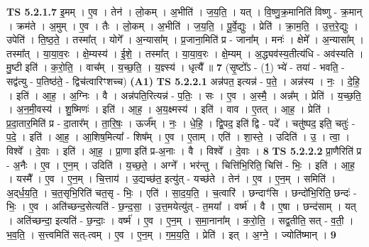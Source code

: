 \documentclass[17pt]{extarticle}
\begin{document}
                                \textbf{ TS 5.2.1.7} \newline
                  इ॒मम् । ए॒व । तेन॑ । लो॒कम् । अ॒भीति॑ । ज॒य॒ति॒ । यत् । वि॒ष्णु॒क्र॒मानिति॑ विष्णु - क्र॒मान् । क्रम॑ते । अ॒मुम् । ए॒व । तैः । लो॒कम् । अ॒भीति॑ । ज॒य॒ति॒ । पू॒र्वे॒द्युः । प्रेति॑ । क्रा॒म॒ति॒ । उ॒त्त॒रे॒द्युः । उपेति॑ । ति॒ष्ठ॒ते॒ । तस्मा᳚त् । योगे᳚ । अ॒न्यासा᳚म् । प्र॒जाना॒मिति॑ प्र - जाना᳚म् । मनः॑ । क्षेमे᳚ । अ॒न्यासा᳚म् । तस्मा᳚त् । या॒या॒व॒रः । क्षे॒म्यस्य॑ । ई॒शे॒ । तस्मा᳚त् । या॒या॒व॒रः । क्षे॒म्यम् । अ॒द्ध्यव॑स्य॒तीत्य॑धि - अव॑स्यति । मु॒ष्टी इति॑ । क॒रो॒ति॒ । वाच᳚म् । य॒च्छ॒ति॒ । य॒ज्ञ्स्य॑ । धृत्यै᳚ ॥ \textbf{  7 } \newline
                  \newline
                      (सृ॒ष्टो᳚ऽ - (1॒) भ्ये॑ - तया॑ - भवति॒ - सद्व॑त्यु - प॒तिष्ठ॑ते॒ - द्विच॑त्वारिꣳशच्च)  \textbf{(A1)} \newline \newline
                                \textbf{ TS 5.2.2.1} \newline
                  अन्न॑पत॒ इत्यन्न॑ - प॒ते॒ । अन्न॑स्य । नः॒ । दे॒हि॒ । इति॑ । आ॒ह॒ । अ॒ग्निः । वै । अन्न॑पति॒रित्यन्न॑ - प॒तिः॒ । सः । ए॒व । अ॒स्मै॒ । अन्न᳚म् । प्रेति॑ । य॒च्छ॒ति॒ । अ॒न॒मी॒वस्य॑ । शु॒ष्मिणः॑ । इति॑ । आ॒ह॒ । अ॒य॒क्ष्मस्य॑ । इति॑ । वाव । ए॒तत् । आ॒ह॒ । प्रेति॑ । प्र॒दा॒तार॒मिति॑ प्र - दा॒तार᳚म् । ता॒रि॒षः॒ । ऊर्ज᳚म् । नः॒ । धे॒हि॒ । द्वि॒पद॒ इति॑ द्वि - पदे᳚ । चतु॑ष्पद॒ इति॒ चतुः॑ - प॒दे॒ । इति॑ । आ॒ह॒ । आ॒शिष॒मित्या᳚ - शिष᳚म् । ए॒व । ए॒ताम् । एति॑ । शा॒स्ते॒ । उदिति॑ । उ॒ । त्वा॒ । विश्वे᳚ । दे॒वाः । इति॑ । आ॒ह॒ । प्रा॒णा इति॑ प्र-अ॒नाः । वै । विश्वे᳚ । दे॒वाः । \textbf{  8} \newline
                  \newline
                                \textbf{ TS 5.2.2.2} \newline
                  प्रा॒णैरिति॑ प्र - अ॒नैः । ए॒व । ए॒न॒म् । उदिति॑ । य॒च्छ॒ते॒ । अग्ने᳚ । भर॑न्तु । चित्ति॑भि॒रिति॒ चित्ति॑ - भिः॒ । इति॑ । आ॒ह॒ । यस्मै᳚ । ए॒व । ए॒न॒म् । चि॒त्ताय॑ । उ॒द्यच्छ॑त॒ इत्यु॑त् - यच्छ॑ते । तेन॑ । ए॒व । ए॒न॒म् । समिति॑ । अ॒द्‌र्ध॒य॒ति॒ । च॒त॒सृभि॒रिति॑ चत॒सृ - भिः॒ । एति॑ । सा॒द॒य॒ति॒ । च॒त्वारि॑ । छन्दाꣳ॑सि । छन्दो॑भि॒रिति॒ छन्दः॑ - भिः॒ । ए॒व । अति॑च्छन्द॒सेत्यति॑ - छ॒न्द॒सा॒ । उ॒त्त॒मयेत्यु॑त् - त॒मया᳚ । वर्ष्म॑ । वै । ए॒षा । छन्द॑साम् । यत् । अति॑च्छन्दा॒ इत्यति॑ - छ॒न्दाः॒ । वर्ष्म॑ । ए॒व । ए॒न॒म् । स॒मा॒नाना᳚म् । क॒रो॒ति॒ । सद्व॒तीति॒ सत् - व॒ती॒ । भ॒व॒ति॒ । स॒त्त्वमिति॑ सत्-त्वम् । ए॒व । ए॒न॒म् । ग॒म॒य॒ति॒ । प्रेति॑ । इत् । अ॒ग्ने॒ । ज्योति॑ष्मान् । \textbf{  9} \newline
\end{document}
